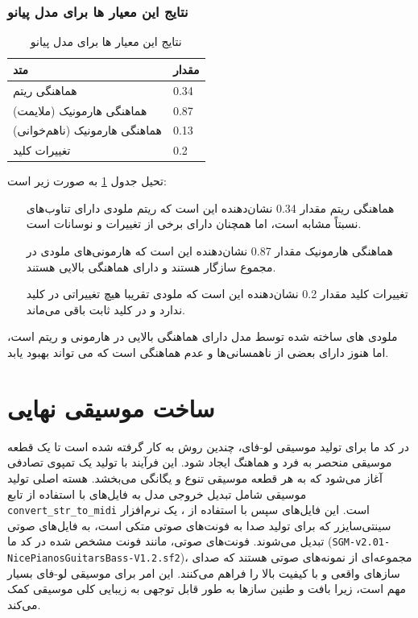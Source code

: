 \subsubsection{نتایج این معیار ها برای مدل پیانو}
\begin{table}
      \centering
      \label{resultPi}
      \caption{نتایج این معیار ها برای مدل پیانو}
      \begin{tabular}{|l|l|}
            \hline
            متد                          & مقدار \\ \hline
            هماهنگی ریتم                 & 0.34  \\ \hline
            هماهنگی هارمونیک (ملایمت)    & 0.87  \\ \hline
            هماهنگی هارمونیک (نا‌هم‌خوانی) & 0.13  \\ \hline
            تغییرات کلید                 & 0.2   \\ \hline
      \end{tabular}
\end{table}
تحیل جدول \ref{resultPi} به صورت زیر است:
\begin{itemize}
      \item[هماهنگی ریتم] مقدار 0.34 نشان‌دهنده این است که ریتم ملودی دارای تناوب‌های نسبتاً مشابه است، اما همچنان دارای برخی از تغییرات و نوسانات است.
      \item[هماهنگی هارمونیک] مقدار 0.87 نشان‌دهنده این است که هارمونی‌های ملودی در مجموع سازگار هستند و دارای هماهنگی بالایی هستند.
      \item[تغییرات کلید] مقدار 0.2 نشان‌دهنده این است که ملودی تقریبا هیچ تغییراتی در کلید ندارد و در کلید ثابت باقی می‌ماند.

\end{itemize}

ملودی های ساخته شده توسط مدل دارای هماهنگی بالایی در هارمونی و ریتم است، اما هنوز دارای بعضی از ناهمسانی‌ها و عدم هماهنگی است که می تواند بهبود یابد.

\section{ساخت موسیقی نهایی}
در کد ما برای تولید موسیقی لو-فای، چندین روش به کار گرفته شده است
تا یک قطعه موسیقی منحصر به فرد و هماهنگ ایجاد شود. این فرآیند با تولید
یک تمپوی تصادفی آغاز می‌شود که به هر قطعه موسیقی تنوع و یگانگی می‌بخشد.
هسته اصلی تولید موسیقی شامل تبدیل خروجی مدل به فایل‌های  با استفاده
از تابع \texttt{convert\_str\_to\_midi} است. این فایل‌های  سپس با
استفاده از ، یک نرم‌افزار سینتی‌سایزر که برای تولید صدا به
فونت‌های صوتی متکی است، به فایل‌های صوتی تبدیل می‌شوند. فونت‌های صوتی، مانند
فونت مشخص شده در کد ما
(\texttt{SGM-v2.01-NicePianosGuitarsBass-V1.2.sf2})، مجموعه‌ای از
نمونه‌های صوتی هستند که صدای سازهای واقعی و با کیفیت بالا را فراهم
می‌کنند. این امر برای موسیقی لو-فای بسیار مهم است، زیرا بافت و طنین سازها
به طور قابل توجهی به زیبایی کلی موسیقی کمک می‌کند.

